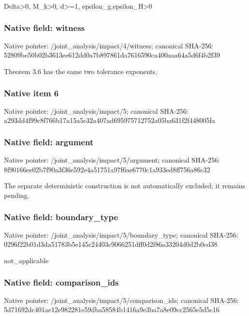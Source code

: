 \documentclass[10pt,a4paper]{article}
\begin{document}
\begingroup\raggedright\sloppy Delta>0,\allowbreak{} M\_\allowbreak{}k>0,\allowbreak{} d>=\allowbreak{}1,\allowbreak{} epsilon\_\allowbreak{}g,\allowbreak{}epsilon\_\allowbreak{}H>0\par\endgroup

\subsubsection{Native field: witness}
Native pointer: /joint\_\allowbreak{}analysis/impact/4/witness; canonical SHA-256: 52809be50b02b3613ee612dd0a7b897861da7616590ca400aaa64a5d6f4b2f39

\begingroup\raggedright\sloppy Theorem 3.6 has the same two tolerance exponents.\par\endgroup

\subsubsection{Native item 6}
Native pointer: /joint\_\allowbreak{}analysis/impact/5; canonical SHA-256: a293dd4f99c8f766b17a15a5c32a407ad695975712752a05ba631f2f448005fa

\subsubsection{Native field: argument}
Native pointer: /joint\_\allowbreak{}analysis/impact/5/argument; canonical SHA-256: 8f90166ee02b7f90a3f36e592e4a51751a97f6ae6770c1a933ed8ff756a86c32

\begingroup\raggedright\sloppy The separate deterministic construction is not automatically excluded;\allowbreak{} it remains pending.\par\endgroup

\subsubsection{Native field: boundary\_\allowbreak{}type}
Native pointer: /joint\_\allowbreak{}analysis/impact/5/boundary\_\allowbreak{}type; canonical SHA-256: 0296f22b01d3da51783b5e145c24403c9066251dff0d2f86a33204d0d2b0cd38

\begingroup\raggedright\sloppy not\_\allowbreak{}applicable\par\endgroup

\subsubsection{Native field: comparison\_\allowbreak{}ids}
Native pointer: /joint\_\allowbreak{}analysis/impact/5/comparison\_\allowbreak{}ids; canonical SHA-256: 5d71692dc401ae12e982281e59dba58584b1416a9e3ba7a8e09cc2565e5d5c16
\end{document}

